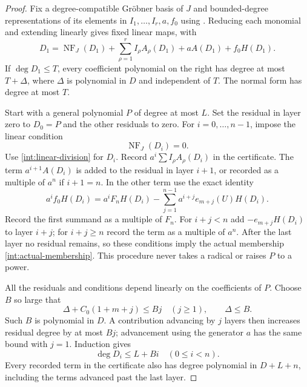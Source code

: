 \begin{proof}
Fix a degree-compatible Gr\"obner basis of $J$ and bounded-degree
representations of its elements in $I_1,\ldots,I_r,a,f_0$ using
.  Reducing each monomial and extending linearly
gives fixed linear maps, with
\begin{equation}\label{int:linear-division}
 D_1=\operatorname{NF}_J(D_1)
       +\sum_{\rho=1}^r I_\rho A_\rho(D_1)
       +aA(D_1)+f_0H(D_1).
\end{equation}
If $\deg D_1\leq T$, every coefficient polynomial on the right
has degree at most $T+\Delta$, where $\Delta$ is polynomial in $D$
and independent of $T$.  The normal form has degree at most $T$.

Start with a general polynomial $P$ of degree at most $L$.  Set the
residual in layer zero to $D_0=P$ and the other residuals to zero.
For $i=0,\ldots,n-1$, impose the linear condition
\[
 \operatorname{NF}_J(D_i)=0.
\]
Use \eqref{int:linear-division} for $D_i$.  Record
$a^i\sum I_\rho A_\rho(D_i)$ in the certificate.  The term
$a^{i+1}A(D_i)$ is added to the residual in layer $i+1$, or recorded
as a multiple of $a^n$ if $i+1=n$.  In the other term use the exact
identity
\[
 a^i f_0H(D_i)
  =a^i F_nH(D_i)
    -\sum_{j=1}^{n-1}a^{i+j}e_{m+j}(U)H(D_i).
\]
Record the first summand as a multiple of $F_n$.  For $i+j<n$ add
$-e_{m+j}H(D_i)$ to layer $i+j$; for $i+j\geq n$ record the term as
a multiple of $a^n$.  After the last layer no residual remains, so
these conditions imply the actual membership
\eqref{int:actual-membership}.  This procedure never takes a radical
or raises $P$ to a power.

All the residuals and conditions depend linearly on the coefficients
of $P$.  Choose $B$ so large that
\[
 \Delta+C_0(1+m+j)\leq Bj\quad(j\geq1),
 \qquad \Delta\leq B.
\]
Such $B$ is polynomial in $D$.  A contribution advancing by $j$
layers then increases residual degree by at most $Bj$; advancement
using the generator $a$ has the same bound with $j=1$.  Induction
gives
\begin{equation}\label{int:layer-degree}
 \deg D_i\leq L+Bi\quad(0\leq i<n).
\end{equation}
Every recorded term in the certificate also has degree polynomial
in $D+L+n$, including the terms advanced past the last layer.


\end{proof}
